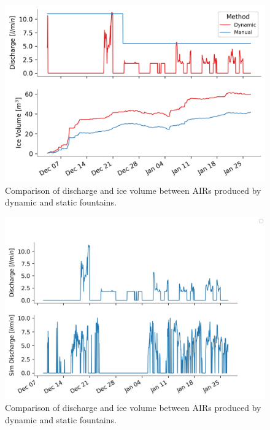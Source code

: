 \documentclass[utf8]{frontiersSCNS}
\begin{document}
\begin{figure}[ht]
	\begin{center}
		\includegraphics[width=\linewidth]{Figures/autovsman_dis.png}
	\end{center}
	\caption{Comparison of discharge and ice volume between AIRs produced by dynamic and static fountains. }
	\label{fig:old_icestupa}
\end{figure}

\begin{figure}[ht]
	\begin{center}
		\includegraphics[width=\linewidth]{Figures/simvsreal_dis.jpg}
	\end{center}
	\caption{Comparison of discharge and ice volume between AIRs produced by dynamic and static fountains. }
	\label{fig:old_icestupa}
\end{figure}
\end{document}
